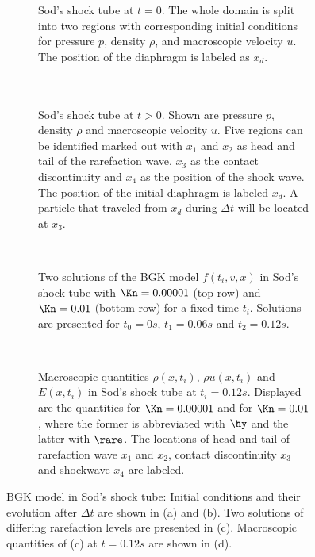 \begin{figure}[H]
	\begin{subfigure}{.45\textwidth}
		\centering
		
		\caption{Sod's shock tube at \(t=0\). The whole domain is split into two regions with corresponding initial conditions for pressure \(p\), density \(\rho\), and macroscopic velocity \(u\). The position of the diaphragm is labeled as \(x_d\).\\ \\ \\}
		\label{Fig:SodTime}
	\end{subfigure}\hfill
	\begin{subfigure}{.45\textwidth}
		\centering
		
		\caption{Sod's shock tube at \(t>0\). Shown are pressure \(p\), density \(\rho\)  and macroscopic velocity \(u\). Five regions can be identified marked out with \(x_1\) and \(x_2\) as head and tail of the rarefaction wave, \(x_3\) as the contact discontinuity and \(x_4\) as the position of the shock wave. The position of the initial diaphragm is labeled \(x_d\). A particle that traveled from \(x_d\) during \(\Delta t\) will be located at \(x_3\).}
		\label{Fig:SodTime0}
	\end{subfigure}\\ \vfill
	\begin{subfigure}{\textwidth}
		\centering
		
		\caption{Two solutions of the BGK model \(f(t_i,v,x)\) in Sod's shock tube with \(\Kn=0.00001\) (top row) and \(\Kn=0.01\) (bottom row) for a fixed time \(t_i\). Solutions are presented for \(t_0=0s\), \(t_1=0.06s\) and \(t_2=0.12s\).}
		\label{Fig:ExamplesSod}
	\end{subfigure}\\%
	\begin{subfigure}{\textwidth}
		
		\caption{Macroscopic quantities \(\rho(x,t_i)\), \(\rho u(x,t_i)\) and \(E(x,t_i)\) in Sod's shock tube at \(t_i=0.12s\). Displayed are the quantities for \(\Kn=0.00001\) and for \(\Kn=0.01\), where the former is abbreviated with \(\hy\) and the latter with \(\rare\). The locations of head and tail of rarefaction wave \(x_1\) and \(x_2\), contact discontinuity \(x_3\) and shockwave \(x_4\) are labeled.}
		\label{Fig:SODHyRare}
	\end{subfigure}\caption{BGK model in Sod's shock tube: Initial conditions and their evolution after \(\Delta t\) are shown in (a) and (b). Two solutions of differing rarefaction levels are presented in (c). Macroscopic quantities of (c) at \(t=0.12s\) are shown in (d).}
	\label{Fig:Sod}
\end{figure}

